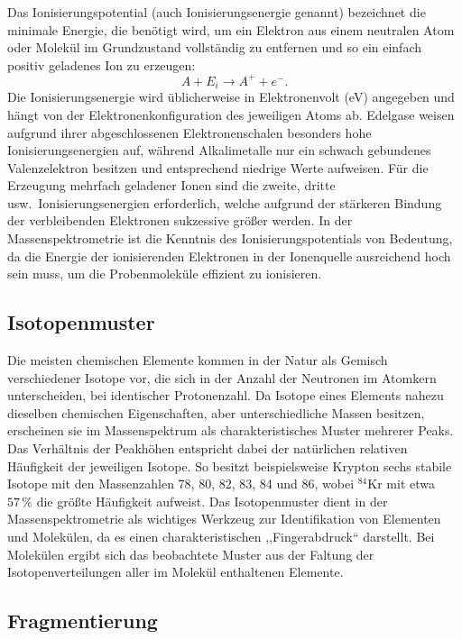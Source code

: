 \documentclass{article}
\begin{document}
Das Ionisierungspotential (auch Ionisierungsenergie genannt) bezeichnet
die minimale Energie, die benötigt wird, um ein Elektron aus einem
neutralen Atom oder Molekül im Grundzustand vollständig zu entfernen und
so ein einfach positiv geladenes Ion zu erzeugen:
\begin{equation}
    A + E_i \rightarrow A^+ + e^-.
    \label{eq:ionisation}
\end{equation}
Die Ionisierungsenergie wird üblicherweise in Elektronenvolt (eV)
angegeben und hängt von der Elektronenkonfiguration des jeweiligen Atoms
ab. Edelgase weisen aufgrund ihrer abgeschlossenen Elektronenschalen
besonders hohe Ionisierungsenergien auf, während Alkalimetalle nur ein
schwach gebundenes Valenzelektron besitzen und entsprechend niedrige
Werte aufweisen. Für die Erzeugung mehrfach geladener Ionen sind die
zweite, dritte usw.\ Ionisierungsenergien erforderlich, welche aufgrund
der stärkeren Bindung der verbleibenden Elektronen sukzessive größer
werden. In der Massenspektrometrie ist die Kenntnis des
Ionisierungspotentials von Bedeutung, da die Energie der ionisierenden
Elektronen in der Ionenquelle ausreichend hoch sein muss, um die
Probenmoleküle effizient zu ionisieren.

\subsection{Isotopenmuster}

Die meisten chemischen Elemente kommen in der Natur als Gemisch
verschiedener Isotope vor, die sich in der Anzahl der Neutronen im
Atomkern unterscheiden, bei identischer Protonenzahl. Da Isotope eines
Elements nahezu dieselben chemischen Eigenschaften, aber unterschiedliche
Massen besitzen, erscheinen sie im Massenspektrum als charakteristisches
Muster mehrerer Peaks. Das Verhältnis der Peakhöhen entspricht dabei der
natürlichen relativen Häufigkeit der jeweiligen Isotope. So besitzt
beispielsweise Krypton sechs stabile Isotope mit den Massenzahlen
78, 80, 82, 83, 84 und 86, wobei $^{84}$Kr mit etwa $57\,\%$ die größte
Häufigkeit aufweist. Das Isotopenmuster dient in der Massenspektrometrie
als wichtiges Werkzeug zur Identifikation von Elementen und Molekülen,
da es einen charakteristischen ,,Fingerabdruck`` darstellt. Bei
Molekülen ergibt sich das beobachtete Muster aus der Faltung der
Isotopenverteilungen aller im Molekül enthaltenen Elemente.

\subsection{Fragmentierung}
\end{document}
